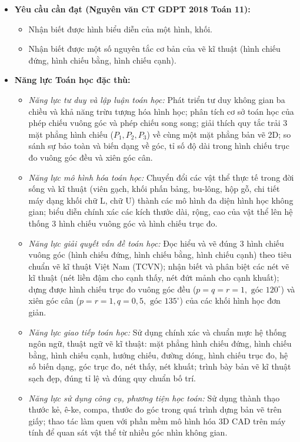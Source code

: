 \documentclass[12pt, a4paper]{article}
\begin{document}
\begin{itemize}[leftmargin=1.2cm]
    \item \textbf{Yêu cầu cần đạt (Nguyên văn CT GDPT 2018 Toán 11):}
    \begin{itemize}[leftmargin=0.6cm]
        \item Nhận biết được hình biểu diễn của một hình, khối.
        \item Nhận biết được một số nguyên tắc cơ bản của vẽ kĩ thuật (hình chiếu đứng, hình chiếu bằng, hình chiếu cạnh).
    \end{itemize}

    \item \textbf{Năng lực Toán học đặc thù:}
    \begin{itemize}[leftmargin=0.6cm]
        \item \textit{Năng lực tư duy và lập luận toán học:} Phát triển tư duy không gian ba chiều và khả năng trừu tượng hóa hình học; phân tích cơ sở toán học của phép chiếu vuông góc và phép chiếu song song; giải thích quy tắc trải 3 mặt phẳng hình chiếu ($P_1, P_2, P_3$) về cùng một mặt phẳng bản vẽ 2D; so sánh sự bảo toàn và biến dạng về góc, tỉ số độ dài trong hình chiếu trục đo vuông góc đều và xiên góc cân.
        \item \textit{Năng lực mô hình hóa toán học:} Chuyển đổi các vật thể thực tế trong đời sống và kĩ thuật (viên gạch, khối phấn bảng, bu-lông, hộp gỗ, chi tiết máy dạng khối chữ L, chữ U) thành các mô hình đa diện hình học không gian; biểu diễn chính xác các kích thước dài, rộng, cao của vật thể lên hệ thống 3 hình chiếu vuông góc và hình chiếu trục đo.
        \item \textit{Năng lực giải quyết vấn đề toán học:} Đọc hiểu và vẽ đúng 3 hình chiếu vuông góc (hình chiếu đứng, hình chiếu bằng, hình chiếu cạnh) theo tiêu chuẩn vẽ kĩ thuật Việt Nam (TCVN); nhận biết và phân biệt các nét vẽ kĩ thuật (nét liền đậm cho cạnh thấy, nét đứt mảnh cho cạnh khuất); dựng được hình chiếu trục đo vuông góc đều ($p=q=r=1, \text{ góc } 120^\circ$) và xiên góc cân ($p=r=1, q=0{,}5, \text{ góc } 135^\circ$) của các khối hình học đơn giản.
        \item \textit{Năng lực giao tiếp toán học:} Sử dụng chính xác và chuẩn mực hệ thống ngôn ngữ, thuật ngữ vẽ kĩ thuật: mặt phẳng hình chiếu đứng, hình chiếu bằng, hình chiếu cạnh, hướng chiếu, đường dóng, hình chiếu trục đo, hệ số biến dạng, góc trục đo, nét thấy, nét khuất; trình bày bản vẽ kĩ thuật sạch đẹp, đúng tỉ lệ và đúng quy chuẩn bố trí.
        \item \textit{Năng lực sử dụng công cụ, phương tiện học toán:} Sử dụng thành thạo thước kẻ, ê-ke, compa, thước đo góc trong quá trình dựng bản vẽ trên giấy; thao tác làm quen với phần mềm mô hình hóa 3D CAD trên máy tính để quan sát vật thể từ nhiều góc nhìn không gian.
    \end{itemize}


\end{itemize}
\end{document}
